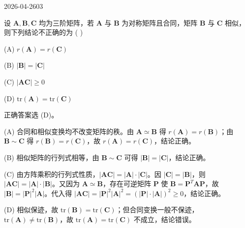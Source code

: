 \begin{mistake}{2026-04-26}{03}

\begin{problemcontent}
设 \(\boldsymbol{A}, \boldsymbol{B}, \boldsymbol{C}\) 均为三阶矩阵，若 \(\boldsymbol{A}\) 与 \(\boldsymbol{B}\) 为对称矩阵且合同，矩阵 \(\boldsymbol{B}\) 与 \(\boldsymbol{C}\) 相似，则下列结论不正确的为 ( )

(A) \(r(\boldsymbol{A}) = r(\boldsymbol{C})\)

(B) \(|\boldsymbol{B}| = |\boldsymbol{C}|\)

(C) \(|\boldsymbol{A}\boldsymbol{C}| \geqslant 0\)

(D) \(\mathrm{tr}(\boldsymbol{A}) = \mathrm{tr}(\boldsymbol{C})\)
\end{problemcontent}

\begin{solutioncontent}
正确答案选 (D)。

(A) 合同和相似变换均不改变矩阵的秩。由 \(\boldsymbol{A} \simeq \boldsymbol{B}\) 得 \(r(\boldsymbol{A}) = r(\boldsymbol{B})\)；由 \(\boldsymbol{B} \sim \boldsymbol{C}\) 得 \(r(\boldsymbol{B}) = r(\boldsymbol{C})\)，故 \(r(\boldsymbol{A}) = r(\boldsymbol{C})\)，结论正确。

(B) 相似矩阵的行列式相等，由 \(\boldsymbol{B} \sim \boldsymbol{C}\) 可得 \(|\boldsymbol{B}| = |\boldsymbol{C}|\)，结论正确。

(C) 由方阵乘积的行列式性质，\(|\boldsymbol{A}\boldsymbol{C}| = |\boldsymbol{A}|\cdot|\boldsymbol{C}|\)。因 \(|\boldsymbol{C}| = |\boldsymbol{B}|\)，则 \(|\boldsymbol{A}\boldsymbol{C}| = |\boldsymbol{A}|\cdot|\boldsymbol{B}|\)。又因为 \(\boldsymbol{A} \simeq \boldsymbol{B}\)，存在可逆矩阵 \(\boldsymbol{P}\) 使 \(\boldsymbol{B} = \boldsymbol{P}^T\boldsymbol{A}\boldsymbol{P}\)，故 \(|\boldsymbol{B}| = |\boldsymbol{P}|^2|\boldsymbol{A}|\)。代入得 \(|\boldsymbol{A}\boldsymbol{C}| = |\boldsymbol{P}|^2|\boldsymbol{A}|^2 = (|\boldsymbol{P}|\cdot|\boldsymbol{A}|)^2 \geqslant 0\)，结论正确。

(D) 相似保迹，故 \(\mathrm{tr}(\boldsymbol{B}) = \mathrm{tr}(\boldsymbol{C})\)；但合同变换一般不保迹，\(\mathrm{tr}(\boldsymbol{A}) \neq \mathrm{tr}(\boldsymbol{B})\)，故 \(\mathrm{tr}(\boldsymbol{A}) = \mathrm{tr}(\boldsymbol{C})\) 不成立，结论错误。
\end{solutioncontent}


\end{mistake}
